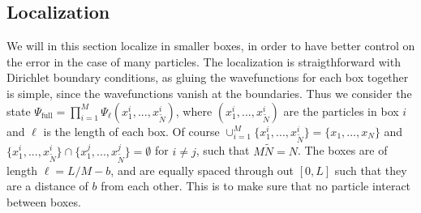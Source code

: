 \documentclass[a4paper,11pt]{article}
\numberwithin{equation}{section}
\begin{document}
	\subsection{Localization}
	We will in this section localize in smaller boxes, in order to have better control on the error in the case of many particles. The localization is straigthforward with Dirichlet boundary conditions, as gluing the wavefunctions for each box together is simple, since the wavefunctions vanish at the boundaries. Thus we consider the state $ \Psi_{\text{full}}=\prod_{i=1}^{M}\Psi_{\ell}(x^i_1,...,x^i_{\tilde{N}}) $, where $ (x_1^i,...,x_{\tilde{N}}^i) $ are the particles in box $ i $ and $ \ell $ is the length of each box. Of course $ \cup_{i=1}^{M}\{x_1^i,...,x_{\tilde{N}}^i\}=\{x_1,...,x_N\} $ and $ \{x_1^i,...,x_{\tilde{N}}^i\}\cap\{x_1^j,...,x_{\tilde{N}}^j\}=\emptyset $ for $ i\neq j $, such that $ M\tilde{N}=N $. The boxes are of length $ \ell=L/M-b $, and are equally spaced through out $ [0,L] $ such that they are a distance of $ b $ from each other. This is to make sure that no particle interact between boxes. 
\end{document}
